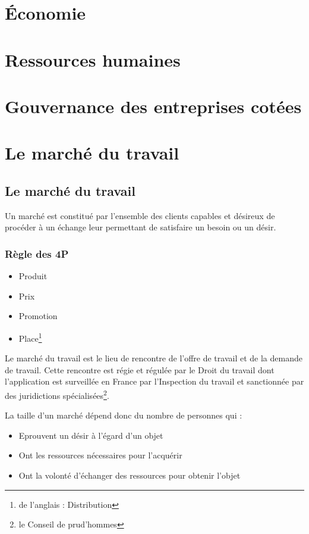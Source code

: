\documentclass[12pt,a4paper,openany]{book}
\begin{document}
	\thispagestyle{empty} %
	\titleBC 
	\dominitoc
	\setcounter{tocdepth}{1}
	\setcounter{secnumdepth}{3}
	\setcounter{minitocdepth}{1}
	\tableofcontents
	\part{Économie}
	
	\part{Ressources humaines}
	
	\part{Gouvernance des entreprises cotées}
	
	\part{Le marché du travail}
	\chapter{Le marché du travail}
	Un marché est constitué par l'ensemble des clients capables et désireux de procéder à un échange leur permettant de satisfaire un besoin ou un désir.
	\section{Règle des 4P}
	\begin{itemize}
		\item Produit
		\item Prix
		\item Promotion
		\item Place\footnote{de l'anglais : Distribution}
	\end{itemize}

	Le marché du travail est le lieu de rencontre de l’offre de travail et de la demande de travail. Cette rencontre est régie et régulée par le Droit du travail
	dont l’application est surveillée en France par l’Inspection du travail et sanctionnée par des juridictions spécialisées\footnote{le Conseil de prud’hommes}.

	La taille d’un marché dépend donc du nombre de personnes qui : 
	\begin{itemize}
		\item Eprouvent un désir à l’égard d’un objet
		\item Ont les ressources nécessaires pour l’acquérir
		\item Ont la volonté d’échanger des ressources pour obtenir l’objet
	\end{itemize}
\end{document}
